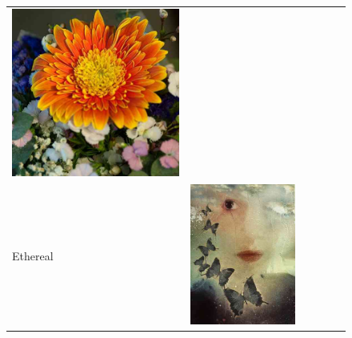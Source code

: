 \begin{figure}
\begin{minipage}[t]{\textwidth}
\begin{tabular}{m{.01\linewidth} m{.16\linewidth} m{.16\linewidth} m{.16\linewidth} m{.16\linewidth} m{.16\linewidth}}
    \includegraphics[width=\linewidth]{../style/figures/flickr_on_flickr/pred_style_Detailed/4.jpg} \\
    \begin{turn}{90}\small{Ethereal}\end{turn} &
    \includegraphics[width=\linewidth]{../style/figures/flickr_on_flickr/pred_style_Ethereal/0.jpg} &

\end{tabular}
\end{minipage}
\end{figure}
